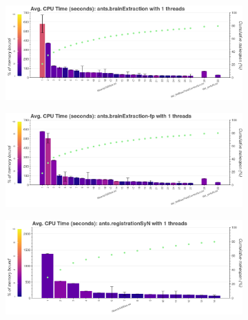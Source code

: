 \documentclass[conference]{IEEEtran}
\begin{document}
\begin{figure}[ht!]
	\centering
	\begin{subfigure}[t]{0.49\textwidth}
		\caption{}
		\label{subfig:hotspots-ants-brainExtraction}
		\includegraphics[width=\textwidth]{figures/hotspots-1thread-ants-brainExtraction.png}
	\end{subfigure}
	\hfill
	\begin{subfigure}[t]{0.49\textwidth}
		\caption{}
		\label{subfig:hotspots-ants-brainExtraction-fp}
		\includegraphics[width=\textwidth]{figures/hotspots-1thread-ants-brainExtraction-fp.png}
	\end{subfigure}
	\begin{subfigure}[t]{0.49\textwidth}
		\caption{}
		\label{subfig:hotspots-ants-registrationSyN}
		\includegraphics[width=\textwidth]{figures/hotspots-1thread-ants-registrationSyN.png}
	\end{subfigure}
	\hfill
	\begin{subfigure}[t]{0.49\textwidth}

\end{subfigure}
\end{figure}
\end{document}

